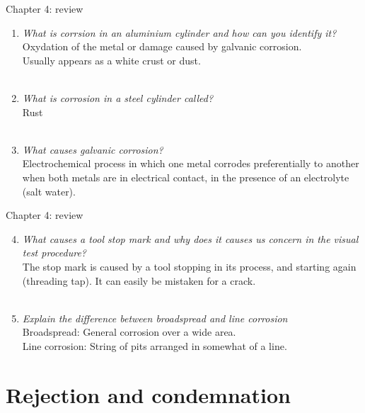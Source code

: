 \documentclass[aspectratio=1610,english,12pt]{beamer}
\begin{document}
\begin{frame}{Chapter 4: review}
	\begin{enumerate}
		\item \textit{What is corrsion in an aluminium cylinder and how can you identify it?}\\
				Oxydation of the metal or damage caused by galvanic corrosion.\\
				Usually appears as a white crust or dust.\\~\\
		\item \textit{What is corrosion in a steel cylinder called?}\\
				Rust\\~\\
		\item \textit{What causes galvanic corrosion?}\\
				Electrochemical process in which one metal corrodes preferentially to another when both metals are in electrical contact, in the presence of an electrolyte (salt water).
	\end{enumerate}
\end{frame}

\begin{frame}{Chapter 4: review}
	\begin{enumerate}
		\setcounter{enumi}{3}
		\item \textit{What causes a tool stop mark and why does it causes us concern in the visual test procedure?}\\
				The stop mark is caused by a tool stopping in its process, and starting again (threading tap). It can easily be mistaken for a crack.\\~\\ 
		\item \textit{Explain the difference between broadspread and line corrosion}\\
				Broadspread: General corrosion over a wide area.\\
				Line corrosion: String of pits arranged in somewhat of a line.
	\end{enumerate}
\end{frame}

\section{Rejection and condemnation}
\end{document}

